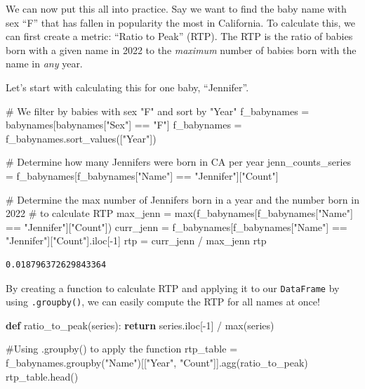 \documentclass[
  letterpaper,
  DIV=11,
  numbers=noendperiod]{scrreprt}
\newenvironment{Shaded}{\begin{snugshade}}{\end{snugshade}}
\newcommand{\BuiltInTok}[1]{\textcolor[rgb]{0.00,0.23,0.31}{#1}}
\newcommand{\CommentTok}[1]{\textcolor[rgb]{0.37,0.37,0.37}{#1}}
\newcommand{\ControlFlowTok}[1]{\textcolor[rgb]{0.00,0.23,0.31}{\textbf{#1}}}
\newcommand{\DecValTok}[1]{\textcolor[rgb]{0.68,0.00,0.00}{#1}}
\newcommand{\KeywordTok}[1]{\textcolor[rgb]{0.00,0.23,0.31}{\textbf{#1}}}
\newcommand{\NormalTok}[1]{\textcolor[rgb]{0.00,0.23,0.31}{#1}}
\newcommand{\OperatorTok}[1]{\textcolor[rgb]{0.37,0.37,0.37}{#1}}
\newcommand{\StringTok}[1]{\textcolor[rgb]{0.13,0.47,0.30}{#1}}
\begin{document}
We can now put this all into practice. Say we want to find the baby name
with sex ``F'' that has fallen in popularity the most in California. To
calculate this, we can first create a metric: ``Ratio to Peak'' (RTP).
The RTP is the ratio of babies born with a given name in 2022 to the
\emph{maximum} number of babies born with the name in \emph{any} year.

Let's start with calculating this for one baby, ``Jennifer''.

\begin{Shaded}
\begin{Highlighting}[]
\CommentTok{\# We filter by babies with sex "F" and sort by "Year"}
\NormalTok{f\_babynames }\OperatorTok{=}\NormalTok{ babynames[babynames[}\StringTok{"Sex"}\NormalTok{] }\OperatorTok{==} \StringTok{"F"}\NormalTok{]}
\NormalTok{f\_babynames }\OperatorTok{=}\NormalTok{ f\_babynames.sort\_values([}\StringTok{"Year"}\NormalTok{])}

\CommentTok{\# Determine how many Jennifers were born in CA per year}
\NormalTok{jenn\_counts\_series }\OperatorTok{=}\NormalTok{ f\_babynames[f\_babynames[}\StringTok{"Name"}\NormalTok{] }\OperatorTok{==} \StringTok{"Jennifer"}\NormalTok{][}\StringTok{"Count"}\NormalTok{]}

\CommentTok{\# Determine the max number of Jennifers born in a year and the number born in 2022 }
\CommentTok{\# to calculate RTP}
\NormalTok{max\_jenn }\OperatorTok{=} \BuiltInTok{max}\NormalTok{(f\_babynames[f\_babynames[}\StringTok{"Name"}\NormalTok{] }\OperatorTok{==} \StringTok{"Jennifer"}\NormalTok{][}\StringTok{"Count"}\NormalTok{])}
\NormalTok{curr\_jenn }\OperatorTok{=}\NormalTok{ f\_babynames[f\_babynames[}\StringTok{"Name"}\NormalTok{] }\OperatorTok{==} \StringTok{"Jennifer"}\NormalTok{][}\StringTok{"Count"}\NormalTok{].iloc[}\OperatorTok{{-}}\DecValTok{1}\NormalTok{]}
\NormalTok{rtp }\OperatorTok{=}\NormalTok{ curr\_jenn }\OperatorTok{/}\NormalTok{ max\_jenn}
\NormalTok{rtp}
\end{Highlighting}
\end{Shaded}

\begin{verbatim}
0.018796372629843364
\end{verbatim}

By creating a function to calculate RTP and applying it to our
\texttt{DataFrame} by using \texttt{.groupby()}, we can easily compute
the RTP for all names at once!

\begin{Shaded}
\begin{Highlighting}[]
\KeywordTok{def}\NormalTok{ ratio\_to\_peak(series):}
    \ControlFlowTok{return}\NormalTok{ series.iloc[}\OperatorTok{{-}}\DecValTok{1}\NormalTok{] }\OperatorTok{/} \BuiltInTok{max}\NormalTok{(series)}

\CommentTok{\#Using .groupby() to apply the function}
\NormalTok{rtp\_table }\OperatorTok{=}\NormalTok{ f\_babynames.groupby(}\StringTok{"Name"}\NormalTok{)[[}\StringTok{"Year"}\NormalTok{, }\StringTok{"Count"}\NormalTok{]].agg(ratio\_to\_peak)}
\NormalTok{rtp\_table.head()}
\end{Highlighting}
\end{Shaded}
\end{document}
